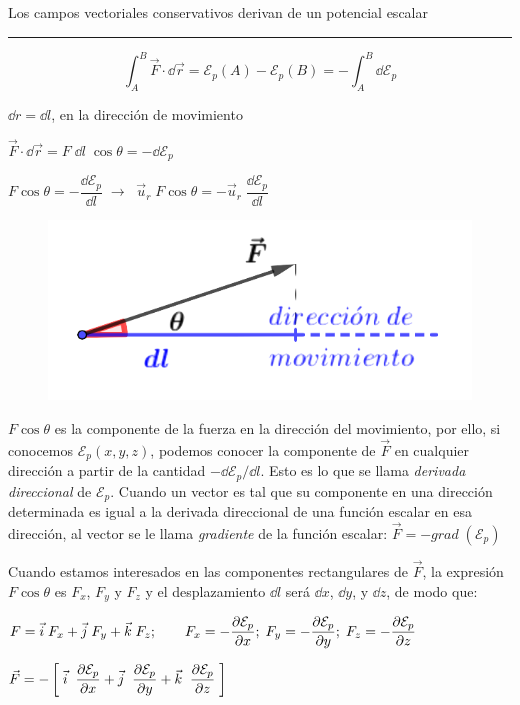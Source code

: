 \begin{small}
\begin{myexampleblock}{Los campos vectoriales conservativos derivan de un potencial escalar}
\rule{150pt}{0.4pt} 

\vspace{2mm}
\begin{equation}
\int_A^B \vec F \cdot \dd \vec r = \mathcal E_p(A)- \mathcal E_p(B)=-\int_A^B\dd \mathcal E_p	
\end{equation}

\begin{multicols}{2}
$\dd r = \dd l$, en la dirección de movimiento

$\vec F\cdot \dd \vec r=F\; \dd l\; \cos \theta =-\dd \mathcal E_p $

$F \cos \theta=- \dfrac{\dd \mathcal E_p}{\dd l} \; \to \;\; \vec u_r\;F \cos \theta=-\vec u_r\; \dfrac{\dd \mathcal E_p}{\dd l}$
\begin{figure}[H]
		\centering
		\includegraphics[width=.4\textwidth]{imagenes/img02-14.png}
		\end{figure}
\end{multicols}

\vspace{2mm}
$F\cos \theta$ es la componente de la fuerza en la dirección del movimiento, por ello, si conocemos $\mathcal E_p(x,y,z)$, podemos conocer la componente de $\overrightarrow F$ en cualquier dirección a partir de la cantidad $-\dd \mathcal E_p / \dd l$. Esto es lo que se llama \emph{derivada direccional} de $\mathcal E_p$. Cuando un vector es tal que su componente en una dirección determinada es igual a la derivada direccional de una función escalar en esa dirección, al vector se le llama \emph{gradiente} de la función escalar: $\vec F=-grad\;( \mathcal E_p)$

\vspace{2mm} Cuando estamos interesados en las componentes rectangulares de $\overrightarrow F$, la expresión $F \cos \theta$ es $F_x$, $F_y$ y $F_z$ y el desplazamiento $\dd l$ será $\dd x$, $\dd y$, y $\dd z$, de modo que:

\vspace{2mm} $\displaystyle F=\vec i\; F_x +\vec j\; F_y +\vec k\; F_z; \qquad F_x=- \pdv{\mathcal E_p}{x};\; F_y=- \pdv{\mathcal E_p}{y};\; F_z=- \pdv{\mathcal E_p}{z}$


\vspace{2mm}$\displaystyle \vec F=-\left[\;\vec i\;\;\pdv{\mathcal E_p}{x} + \vec j\;\;\pdv{\mathcal E_p}{y} + \vec k\;\;\pdv{\mathcal E_p}{z}\; \right]$


\end{myexampleblock}
\end{small}
